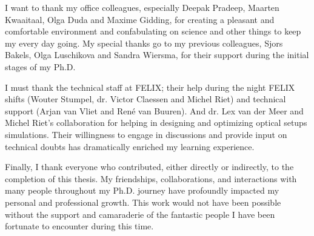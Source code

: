  I want to thank my office colleagues, especially Deepak Pradeep, Maarten Kwaaitaal, Olga Duda and Maxime Gidding, for creating a pleasant and comfortable environment and confabulating on science and other things to keep my every day going. My special thanks go to my previous colleagues, Sjors Bakels, Olga Luschikova and Sandra Wiersma, for their support during the initial stages of my Ph.D.

I must thank the technical staff at FELIX; their help during the night FELIX shifts (Wouter Stumpel, dr. Victor Claessen and Michel Riet) and technical support (Arjan van Vliet and Ren\'{e} van Buuren). And dr. Lex van der Meer and Michel Riet's collaboration for helping in designing and optimizing optical setups simulations. Their willingness to engage in discussions and provide input on technical doubts has dramatically enriched my learning experience.

Finally, I thank everyone who contributed, either directly or indirectly, to the completion of this thesis. My friendships, collaborations, and interactions with many people throughout my Ph.D. journey have profoundly impacted my personal and professional growth. This work would not have been possible without the support and camaraderie of the fantastic people I have been fortunate to encounter during this time.